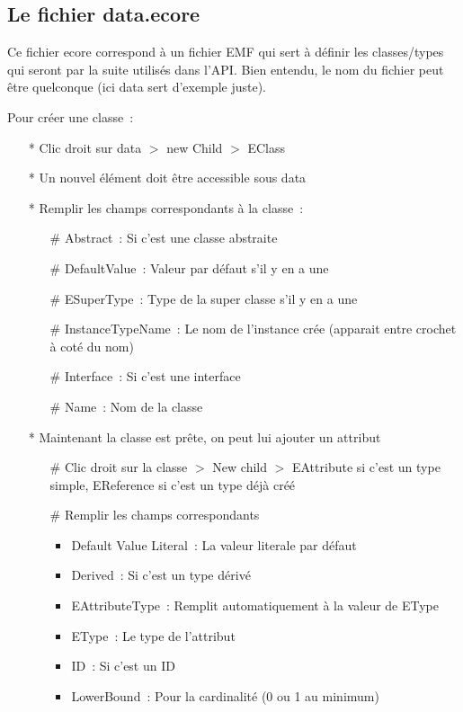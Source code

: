 \documentclass{article}
\begin{document}
\subsection*{Le fichier data.ecore}
Ce fichier ecore correspond \`a un fichier EMF qui sert \`a d\'efinir les classes/types qui seront par la suite utilis\'es dans l'API. Bien entendu, le nom du fichier peut \^etre quelconque (ici data sert d'exemple juste).

Pour cr\'eer une classe~:
\begin{itemize}
\item[*] Clic droit sur data $>$ new Child $>$ EClass
\item[*] Un nouvel \'el\'ement doit \^etre accessible sous data
\item[*] Remplir les champs correspondants \`a la classe~:
  \begin{itemize}
  \item[\#] Abstract~: Si c'est une classe abstraite
  \item[\#] DefaultValue~: Valeur par d\'efaut s'il y en a une
  \item[\#] ESuperType~: Type de la super classe s'il y en a une
  \item[\#] InstanceTypeName~: Le nom de l'instance cr\'ee (apparait entre crochet \`a cot\'e du nom)
  \item[\#] Interface~: Si c'est une interface
  \item[\#] Name~: Nom de la classe
  \end{itemize}
\item[*] Maintenant la classe est pr\^ete, on peut lui ajouter un attribut
  \begin{itemize}
  \item[\#] Clic droit sur la classe $>$ New child $>$ EAttribute si c'est un type simple, EReference si c'est un type d\'ej\`a cr\'e\'e
  \item[\#] Remplir les champs correspondants
    \begin{itemize}
    \item Default Value Literal~: La valeur literale par d\'efaut
    \item Derived~: Si c'est un type d\'eriv\'e
    \item EAttributeType~: Remplit automatiquement \`a la valeur de EType
    \item EType~: Le type de l'attribut
    \item ID~: Si c'est un ID
    \item LowerBound~: Pour la cardinalit\'e (0 ou 1 au minimum)

\end{itemize}
\end{itemize}
\end{itemize}
\end{document}
